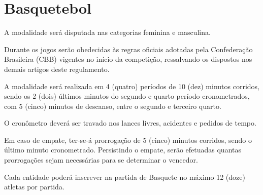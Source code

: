 {\let\clearpage\relax \chapter{Basquetebol}}

\begin{article}
	A modalidade será disputada nas categorias feminina e masculina.
\end{article}

\begin{article}
	Durante os jogos serão obedecidas às regras oficiais adotadas pela Confederação
Brasileira (CBB) vigentes no início da competição, ressalvando os dispostos nos demais artigos deste regulamento.
\end{article}

\begin{article}
	A modalidade será realizada em 4 (quatro) períodos de 10 (dez) minutos corridos, sendo os 2 (dois) últimos minutos do segundo e quarto período cronometrados, com 5 (cinco) minutos de descanso, entre o segundo e terceiro quarto.

	\begin{xparagraph}
		O cronômetro deverá ser travado nos lances livres, acidentes e pedidos de tempo.
	\end{xparagraph}

	\begin{xparagraph}
		Em caso de empate, ter-se-á prorrogação de 5 (cinco) minutos corridos, sendo o último minuto cronometrado. Persistindo o empate, serão efetuadas quantas prorrogações sejam necessárias para se determinar o vencedor.
	\end{xparagraph}
\end{article}

\begin{article}
	Cada entidade poderá inscrever na partida de Basquete no máximo 12 (doze) atletas por partida.
\end{article}
